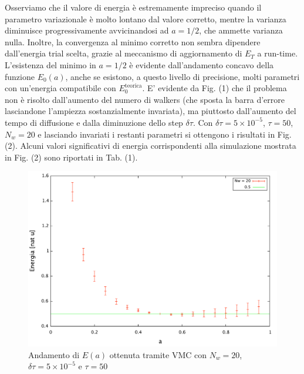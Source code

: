 \documentclass[11pt,a4paper]{article}
\begin{document}
Osserviamo che il valore di energia è estremamente impreciso quando il parametro variazionale è molto lontano dal valore corretto, mentre la varianza diminuisce progressivamente avvicinandosi ad $a=1/2$, che ammette varianza nulla. Inoltre, la convergenza al minimo corretto non sembra dipendere dall'energia trial scelta, grazie al meccanismo di aggiornamento di $E_T$ a run-time.\\ L'esistenza del minimo in $a=1/2$ è evidente dall'andamento concavo della funzione $E_0(a)$, anche se esistono, a questo livello di precisione, molti parametri con un'energia compatibile con $E_0^{\text{teorica}}$. E' evidente da Fig. (1) che il problema non è risolto dall'aumento del numero di walkers (che sposta la barra d'errore lasciandone l'ampiezza sostanzialmente invariata), ma piuttosto dall'aumento del tempo di diffusione e dalla diminuzione dello step $\delta \tau$. Con $\delta\tau = 5\times 10^{-5}$, $\tau=50$, $N_w = 20$ e lasciando invariati i restanti parametri si ottengono i risultati in Fig. (2). Alcuni valori significativi di energia corrispondenti alla simulazione mostrata in Fig. (2) sono riportati in Tab. (1). 
\begin{figure}[!h]
\centering
\includegraphics[scale=0.4]{Img/ho_var_good}
\caption{Andamento di $E(a)$ ottenuta tramite VMC con $N_w=20$, $\delta\tau=5\times 10^{-5}$ e $\tau=50$}
\end{figure}
\end{document}
